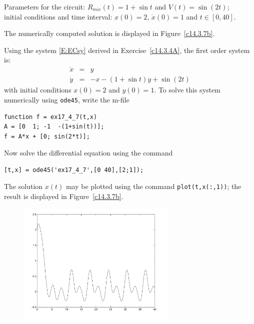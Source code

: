 \documentclass{ximera}
\begin{document}
\begin{computerExercise} \label{c14.3.7b}
Parameters for the circuit: $R_{mic}(t) = 1+\sin t$ and $V(t) = \sin(2t)$;\\
initial conditions and time interval: $x(0) = 2$, $\dot{x}(0) = 1$ and $t\in[0,40]$.

\begin{solution}
\ans The numerically computed solution is displayed in 
Figure~\ref{c14.3.7b}.

\soln  Using the system \eqref{E:ECsy} derived in 
Exercise~\ref{c14.3.4A}, the first order system is:
\begin{eqnarray*}
\dot{x} & = & y \\
\dot{y} & = & -x - (1+\sin t)y + \sin(2t)
\end{eqnarray*}
with initial conditions $x(0)=2$ and $y(0)=1$.  To solve this system numerically 
using {\tt ode45}, write the m-file
\begin{verbatim}
function f = ex17_4_7(t,x)
A = [0  1; -1  -(1+sin(t))];
f = A*x + [0; sin(2*t)];
\end{verbatim}
Now solve the differential equation using the command
\begin{verbatim}
[t,x] = ode45('ex17_4_7',[0 40],[2;1]);
\end{verbatim}
The solution $x(t)$ may be plotted using the command {\tt plot(t,x(:,1))}; the 
result is displayed in Figure~\ref{c14.3.7b}.
\begin{figure}[htb]
     \centerline{%
     \includegraphics[width=3.0in]{exfigure/fig17-4-7.pdf}}
\end{figure} 


\end{solution}
\end{computerExercise}
\end{document}
